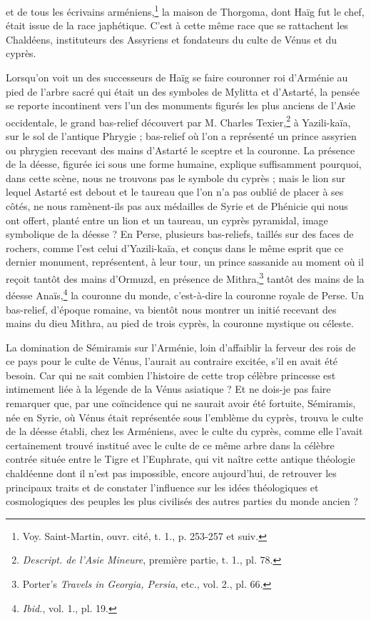 \documentclass[a4paper, 11pt, oneside, polutonikogreek, french]{article}
\begin{document}
et de tous les écrivains arméniens,\footnote{Voy. Saint-Martin, ouvr. cité, t. 1., p. 253-257 et suiv.} la maison de Thorgoma, dont Haïg fut le chef, était issue de la race japhétique. C'est à cette même race que se rattachent les Chaldéens, instituteurs des Assyriens et fondateurs du culte de Vénus et du cyprès.

Lorsqu'on voit un des successeurs de Haïg se faire couronner roi d'Arménie au pied de l'arbre sacré qui était un des symboles de Mylitta et d'Astarté, la pensée se reporte incontinent vers l'un des monuments figurés les plus anciens de l'Asie occidentale, le grand bas-relief découvert par M. Charles Texier,\footnote{\emph{Descript. de l'Asie Mineure}, première partie, t. 1., pl. 78.} à Yazili-kaïa, sur le sol de l'antique Phrygie ; bas-relief où l'on a représenté un prince assyrien ou phrygien recevant des mains d'Astarté le sceptre et la couronne. La présence de la déesse, figurée ici sous une forme humaine, explique suffisamment pourquoi, dans cette scène, nous ne trouvons pas le symbole du cyprès ; mais le lion sur lequel Astarté est debout et le taureau que l'on n'a pas oublié de placer à ses côtés, ne nous ramènent-ils pas aux médailles de Syrie et de Phénicie qui nous ont offert, planté entre un lion et un taureau, un cyprès pyramidal, image symbolique de la déesse ? En Perse, plusieurs bas-reliefs, taillés sur des faces de rochers, comme l'est celui d'Yazili-kaïa, et conçus dans le même esprit que ce dernier monument, représentent, à leur tour, un prince sassanide au moment où il reçoit tantôt des mains d'Ormuzd, en présence de Mithra,\footnote{Porter's \emph{Travels in Georgia, Persia}, etc., vol. 2., pl. 66.} tantôt des mains de la déesse Anaïs,\footnote{\emph{Ibid.}, vol. 1., pl. 19.} la couronne du monde, c'est-à-dire la couronne royale de Perse. Un bas-relief, d'époque romaine, va bientôt nous montrer un initié recevant des mains du dieu Mithra, au pied de trois cyprès, la couronne mystique ou céleste.

La domination de Sémiramis sur l'Arménie, loin d'affaiblir la ferveur des rois de ce pays pour le culte de Vénus, l'aurait au contraire excitée, s'il en avait été besoin. Car qui ne sait combien l'histoire de cette trop célèbre princesse est intimement liée à la légende de la Vénus asiatique ? Et ne dois-je pas faire remarquer que, par une coïncidence qui ne saurait avoir été fortuite, Sémiramis, née en Syrie, où Vénus était représentée sous l'emblème du cyprès, trouva le culte de la déesse établi, chez les Arméniens, avec le culte du cyprès, comme elle l'avait certainement trouvé institué avec le culte de ce même arbre dans la célèbre contrée située entre le Tigre et l'Euphrate, qui vit naître cette antique théologie chaldéenne dont il n'est pas impossible, encore aujourd'hui, de retrouver les principaux traits et de constater l'influence sur les idées théologiques et cosmologiques des peuples les plus civilisés des autres parties du monde ancien ?
\end{document}
